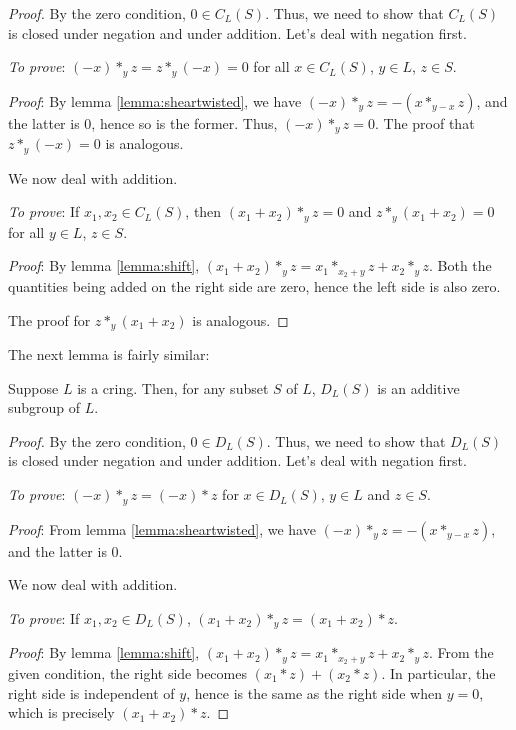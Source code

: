 \documentclass[10pt]{amsart}
\begin{document}
\begin{proof}
  By the zero condition, $0 \in C_L(S)$. Thus, we need to show
  that $C_L(S)$ is closed under negation and under addition. Let's
  deal with negation first.

  {\em To prove}: $(-x) *_y z = z*_y (-x) = 0$ for all $x \in C_L(S)$,
  $y \in L$, $z \in S$.

  {\em Proof}: By lemma \ref{lemma:sheartwisted}, we have $(-x) *_y z
  = -(x *_{y-x} z)$, and the latter is $0$, hence so is the
  former. Thus, $(-x) *_y z = 0$. The proof that $z *_y (-x) = 0$ is
  analogous.

  We now deal with addition.

  {\em To prove}: If $x_1, x_2 \in C_L(S)$, then $(x_1 + x_2) *_y z =
  0$ and $z *_y (x_1 + x_2) = 0$ for all $y \in L$, $z \in S$.

  {\em Proof}: By lemma \ref{lemma:shift}, $(x_1 + x_2) *_y z = x_1 *_{x_2 +
    y} z + x_2 *_y z$. Both the quantities being added on the right
  side are zero, hence the left side is also zero.

  The proof for $z *_y (x_1 + x_2)$ is analogous.
\end{proof}

The next lemma is fairly similar:

\begin{lemma}
  Suppose $L$ is a cring. Then, for any subset $S$ of $L$,
  $D_L(S)$ is an additive subgroup of $L$.
\end{lemma}

\begin{proof}
 By the zero condition, $0 \in D_L(S)$. Thus, we need to show
  that $D_L(S)$ is closed under negation and under addition. Let's
  deal with negation first.

  {\em To prove}: $(-x) *_y z = (-x) * z$ for $x \in D_L(S)$, $y \in
  L$ and $z \in S$.

  {\em Proof}: From lemma \ref{lemma:sheartwisted}, we have $(-x) *_y
  z = -(x *_{y-x} z)$, and the latter is $0$. 

  We now deal with addition.

  {\em To prove}: If $x_1, x_2 \in D_L(S)$, $(x_1 + x_2) *_y z = (x_1
  + x_2) * z$.

  {\em Proof}: By lemma \ref{lemma:shift}, $(x_1 + x_2) *_y z = x_1
  *_{x_2 + y} z + x_2 *_y z$. From the given condition, the right side
  becomes $(x_1 * z) + (x_2 * z)$. In particular, the right side is
  independent of $y$, hence is the same as the right side when $y =
  0$, which is precisely $(x_1 + x_2) * z$.
\end{proof}
\end{document}
